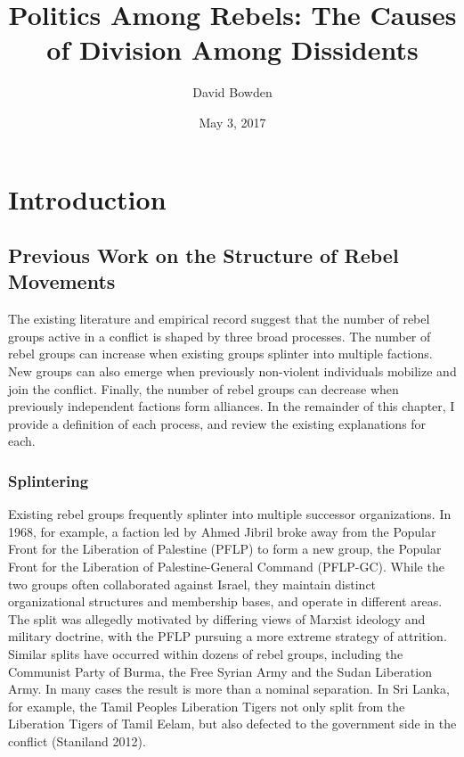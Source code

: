 \documentclass[12pt,]{article}
\title{Politics Among Rebels: The Causes of Division Among Dissidents}
\author{David Bowden}
\date{May 3, 2017}
\begin{document}
\maketitle

{
\setcounter{tocdepth}{2}
\tableofcontents
}
\doublespacing

\section{Introduction}\label{introduction}

\subsection{Previous Work on the Structure of Rebel
Movements}\label{previous-work-on-the-structure-of-rebel-movements}

The existing literature and empirical record suggest that the number of
rebel groups active in a conflict is shaped by three broad processes.
The number of rebel groups can increase when existing groups splinter
into multiple factions. New groups can also emerge when previously
non-violent individuals mobilize and join the conflict. Finally, the
number of rebel groups can decrease when previously independent factions
form alliances. In the remainder of this chapter, I provide a definition
of each process, and review the existing explanations for each.

\subsubsection{Splintering}\label{splintering}

Existing rebel groups frequently splinter into multiple successor
organizations. In 1968, for example, a faction led by Ahmed Jibril broke
away from the Popular Front for the Liberation of Palestine (PFLP) to
form a new group, the Popular Front for the Liberation of
Palestine-General Command (PFLP-GC). While the two groups often
collaborated against Israel, they maintain distinct organizational
structures and membership bases, and operate in different areas. The
split was allegedly motivated by differing views of Marxist ideology and
military doctrine, with the PFLP pursuing a more extreme strategy of
attrition. Similar splits have occurred within dozens of rebel groups,
including the Communist Party of Burma, the Free Syrian Army and the
Sudan Liberation Army. In many cases the result is more than a nominal
separation. In Sri Lanka, for example, the Tamil Peoples Liberation
Tigers not only split from the Liberation Tigers of Tamil Eelam, but
also defected to the government side in the conflict (Staniland 2012).
\end{document}
